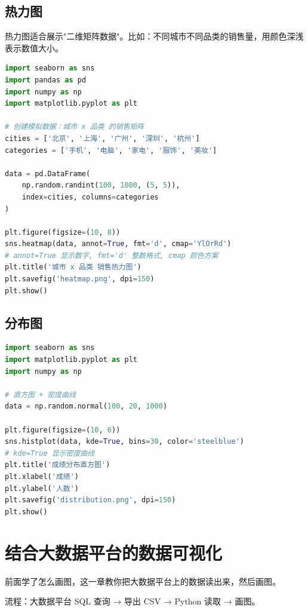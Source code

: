 \documentclass[12pt,a4paper]{article}
\begin{document}
\subsection{热力图}

\begin{theorybox}[热力图适合什么场景？]
热力图适合展示"二维矩阵数据"。比如：不同城市不同品类的销售量，用颜色深浅表示数值大小。
\end{theorybox}

\begin{lstlisting}[language=Python]
import seaborn as sns
import pandas as pd
import numpy as np
import matplotlib.pyplot as plt

# 创建模拟数据：城市 x 品类 的销售矩阵
cities = ['北京', '上海', '广州', '深圳', '杭州']
categories = ['手机', '电脑', '家电', '服饰', '美妆']

data = pd.DataFrame(
    np.random.randint(100, 1000, (5, 5)),
    index=cities, columns=categories
)

plt.figure(figsize=(10, 8))
sns.heatmap(data, annot=True, fmt='d', cmap='YlOrRd')
# annot=True 显示数字, fmt='d' 整数格式, cmap 颜色方案
plt.title('城市 x 品类 销售热力图')
plt.savefig('heatmap.png', dpi=150)
plt.show()
\end{lstlisting}

\subsection{分布图}

\begin{lstlisting}[language=Python]
import seaborn as sns
import matplotlib.pyplot as plt
import numpy as np

# 直方图 + 密度曲线
data = np.random.normal(100, 20, 1000)

plt.figure(figsize=(10, 6))
sns.histplot(data, kde=True, bins=30, color='steelblue')
# kde=True 显示密度曲线
plt.title('成绩分布直方图')
plt.xlabel('成绩')
plt.ylabel('人数')
plt.savefig('distribution.png', dpi=150)
plt.show()
\end{lstlisting}

\section{结合大数据平台的数据可视化}

\begin{knowledgebox}[这一章要做什么？]
前面学了怎么画图，这一章教你把大数据平台上的数据读出来，然后画图。

流程：大数据平台 SQL 查询 → 导出 CSV → Python 读取 → 画图。
\end{knowledgebox}
\end{document}
